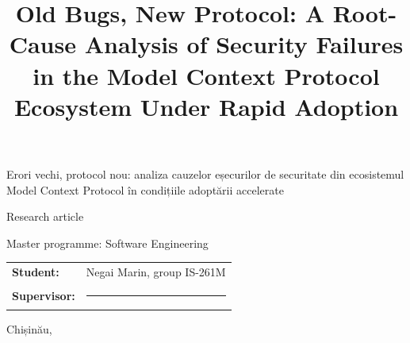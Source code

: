 
\title{Old Bugs, New Protocol: A Root-Cause Analysis of Security Failures in the Model Context Protocol Ecosystem Under Rapid Adoption}{Erori vechi, protocol nou: analiza cauzelor eșecurilor de securitate din ecosistemul Model Context Protocol în condițiile adoptării accelerate}



\begin{titlepage}

    {\MakeUppercase{\ministryname} \par}
    \vspace{0.2cm}
    {\large \universityname \par}
    {\large \facultyname \par}
    {\large \departmentname \par}

	\vfill

	{\LARGE \titleen \par}
	\vspace{0.5cm}
	{\large \mdseries \itshape \titlero \par}
	\vspace{1cm}
	{\Large Research article \par}
	\vspace{0.2cm}
	{\large \mdseries Master programme: Software Engineering \par}

	\vfill

    \begin{table}[h!]
        \hfill
        \begin{tabular}{ll}
        \textbf{Student:}    & Negai Marin, group IS-261M \\[0.3cm]
        \textbf{Supervisor:} & \rule{6.5cm}{0.4pt} \\
        \end{tabular}
    \end{table}

	\vfill

	{\large Chișinău, \degreeyear \par}

\end{titlepage}
